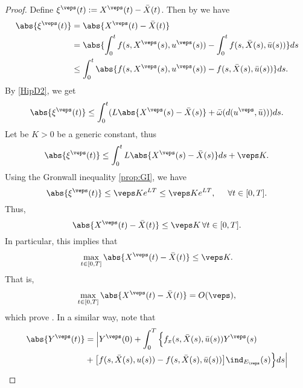 \begin{proof}
    Define $\xi^{\veps}(t) := X^{\veps}(t) - \Bar{X}(t)$. Then by 
     we have
    \begin{align*}
        \abs{\xi^{\veps}(t)} &= \abs{X^{\veps}(t) - \Bar{X}(t)} \\
            &= \abs{\int_{0}^{t}f(s, X^{\veps}(s), u^{\veps}(s)) %
                - \int_{0}^{t} f(s, \Bar{X}(s), \Bar{u}(s))} ds \\
            &\leq \int_{0}^{t} \abs{f(s, X^{\veps}(s), u^{\veps}(s)) - %
                 f(s, \Bar{X}(s), \Bar{u}(s))}ds.
    \end{align*}
    By \cref{HipD2}, we get 
    \begin{equation*}
        \abs{\xi^{\veps}(t)} \leq \int_{0}^{t}(L\abs{X^{\veps}(s) %
            - \Bar{X}(s)} + \Bar{\omega}(d(u^{\veps},\Bar{u})))ds.
    \end{equation*}
    Let be $K>0$ be a generic constant, thus
    \begin{equation*}
        \abs{\xi^{\veps}(t)} \leq \int_{0}^{t}L\abs{X^{\veps}(s) %
            - \Bar{X}(s)}ds + \veps K.
    \end{equation*}
    Using the Gronwall inequality \eqref{prop:GI}, we have 
    \begin{equation}
        \abs{\xi^{\veps}(t)} \leq \veps K e^{LT} \leq \veps K %
            e^{LT}, \hspace{0.5cm} \forall t\in[0,T].
    \end{equation}
    Thus,
    \begin{equation*}
        \abs{X^{\veps}(t) - \Bar{X}(t)} \leq \veps K 
        \, \forall t\in[0,T].
    \end{equation*}
    In particular, this implies that
    \begin{equation*}
        \max_{t \in [0,T]}\abs{X^{\veps}(t) - \Bar{X}(t)} \leq \veps K.
    \end{equation*}
    That is,
    \begin{equation*}
        \max_{t \in [0,T]}\abs{X^{\veps}(t) - \Bar{X}(t)} = O(\veps),
    \end{equation*}
    which prove . In a similar way, note that
    \begin{align*}
        \abs{Y^{\veps}(t)} &= \Big\vert Y^{\veps}(0) + \int_{0}^{T} %
            \Big\{f_x(s, \Bar{X}(s), \Bar{u}(s))Y^{\veps}(s) \\
        &+ \big[ f(s, \Bar{X}(s),u(s)) - f(s, \Bar{X}(s), \Bar{u}(s))\big]%
            \ind_{E_{\veps}}(s) \Big\}ds \Big\vert \\

\end{align*}
\end{proof}
